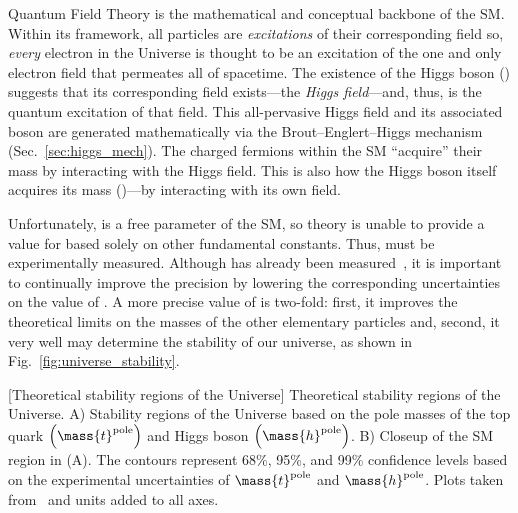 Quantum Field Theory is the mathematical and conceptual backbone of the SM.
Within its framework, all particles are \emph{excitations} of their corresponding field so, \eg \emph{every} electron in the Universe is thought to be an excitation of the one and only electron field that permeates all of spacetime.
The existence of the Higgs boson (\PH) suggests that its corresponding field exists---the \emph{Higgs field}---and, thus, \PH is the quantum excitation of that field.
This all-pervasive Higgs field and its associated boson are generated mathematically via the Brout--Englert--Higgs mechanism (Sec.~\ref{sec:higgs_mech}).
The charged fermions within the SM ``acquire'' their mass by interacting with the Higgs field.
This is also how the Higgs boson itself acquires its mass (\mH)---by interacting with its own field.

Unfortunately, \mH is a free parameter of the SM, so theory is unable to provide a value for \mH based solely on other fundamental constants. %
Thus, \mH must be experimentally measured.
Although \mH has already been measured~\cite{chatrchyan_observation_2012, aad_observation_2012, chatrchyan_observation_2013, PhysRevLett.114.191803, the_cms_collaboration_precise_2015, HIG_16_041, aaboud_measurement_2018, CMS-PAS-HIG-18-029, sirunyan_measurement_2020}, it is important to continually improve the precision by lowering the corresponding uncertainties on the value of \mh.
A more precise value of \mH is two-fold:
first, it improves the theoretical limits on the masses of the other elementary particles and, second, it very well may determine the stability of our universe, as shown in Fig.~\ref{fig:universe_stability}.
\begin{multiFigure}
    \centering
        [Theoretical stability regions of the Universe]
        {Theoretical stability regions of the Universe.
        A) Stability regions of the Universe based on the pole masses of the top quark $\left( \mass{t}^\text{pole} \right)$ and Higgs boson $\left( \mass{h}^\text{pole} \right)$.
        B) Closeup of the SM region in (A).
        The contours represent 68\%, 95\%, and 99\% confidence levels based on the experimental uncertainties of $\mass{t}^\text{pole}$ and $\mass{h}^\text{pole}$.
        Plots taken from~\cite{univ_stab} and units added to all axes.
        }
    \label{fig:universe_stability}
\end{multiFigure}

